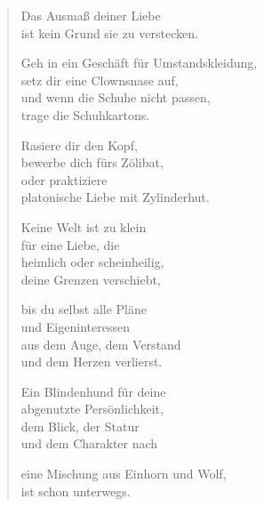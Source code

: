 
\cleartoverso


\begin{verse}

Das Ausmaß deiner Liebe\\
ist kein Grund sie zu verstecken.

Geh in ein Geschäft für Umstandskleidung,\\
setz dir eine Clownsnase auf,\\
und wenn die Schuhe nicht passen,\\
trage die Schuhkartons.

Rasiere dir den Kopf,\\
bewerbe dich fürs Zölibat,\\
oder praktiziere\\
platonische Liebe mit Zylinderhut.

Keine Welt ist zu klein\\
für eine Liebe, die\\
heimlich oder scheinheilig,\\
deine Grenzen verschiebt,

bis du selbst alle Pläne\\
und Eigeninteressen\\
aus dem Auge, dem Verstand\\
und dem Herzen verlierst.

\clearpage

Ein Blindenhund für deine\\
abgenutzte Persönlichkeit,\\
dem Blick, der Statur\\
und dem Charakter nach

eine Mischung aus Einhorn und Wolf,\\
ist schon unterwegs.

\end{verse}

\clearpage


